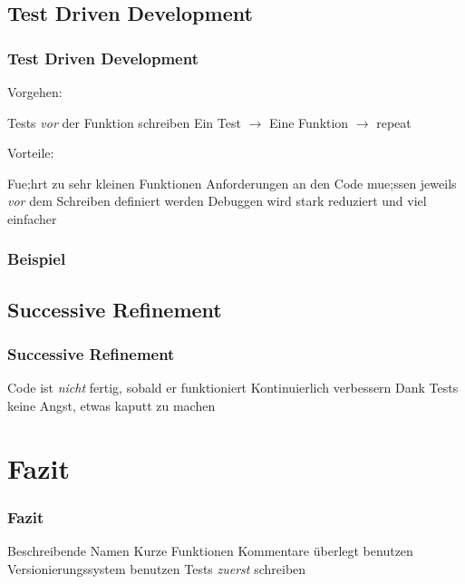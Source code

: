 \documentclass{beamer}
\begin{document}
\subsection{Test Driven Development}
\begin{frame}
    \frametitle{Test Driven Development}
    Vorgehen:

    \begin{outline}
        \1 Tests \emph{vor} der Funktion schreiben
        \1 Ein Test $\rightarrow$ Eine Funktion $\rightarrow$ repeat
    \end{outline}\pause

    Vorteile:

    \begin{outline}
        \1 Fue;hrt zu sehr kleinen Funktionen
        \1 Anforderungen an den Code mue;ssen jeweils \emph{vor} dem Schreiben
        definiert werden
        \1 Debuggen wird stark reduziert und viel einfacher
    \end{outline}
\end{frame}
\begin{frame}
    \frametitle{Beispiel}
\end{frame}

\subsection{Successive Refinement}
\begin{frame}
    \frametitle{Successive Refinement}
    \begin{outline}
        \1 Code ist \emph{nicht} fertig, sobald er funktioniert
        \1 Kontinuierlich verbessern
        \1 Dank Tests keine Angst, etwas kaputt zu machen
    \end{outline}
\end{frame}

\section{Fazit}
\begin{frame}
    \frametitle{Fazit}
    \begin{outline}
        \1 Beschreibende Namen
        \1 Kurze Funktionen
        \1 Kommentare überlegt benutzen
        \1 Versionierungssystem benutzen
        \1 Tests \emph{zuerst} schreiben
    \end{outline}
\end{frame}
\end{document}
